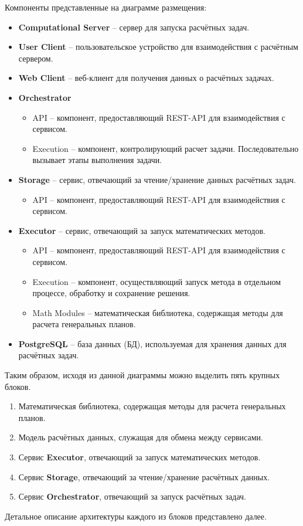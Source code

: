 \noindent Компоненты представленные на диаграмме размещения:
\begin{itemize}
	\item \textbf{Computational Server} -- сервер для запуска расчётных задач.
	\item \textbf{User Client} -- пользовательское устройство для взаимодействия с расчётным сервером.
	\item \textbf{Web Client} -- веб-клиент для получения данных о расчётных задачах.
	\item \textbf{Orchestrator}
	\begin{itemize}
		\item API -- компонент, предоставляющий REST-API для взаимодействия с сервисом.
		\item Execution -- компонент, контролирующий расчет задачи. Последовательно вызывает этапы выполнения задачи.
	\end{itemize}
	\item \textbf{Storage} -- сервис, отвечающий за чтение/хранение данных расчётных задач.
	\begin{itemize}
		\item API -- компонент, предоставляющий REST-API для взаимодействия с сервисом.
	\end{itemize}
	\item \textbf{Executor} -- сервис, отвечающий за запуск математических методов.
	\begin{itemize}
		\item API -- компонент, предоставляющий REST-API для взаимодействия с сервисом.
		\item Execution -- компонент, осуществляющий запуск метода в отдельном процессе, обработку и сохранение решения.
		\item Math Modules -- математическая библиотека, содержащая методы для расчета генеральных планов.
	\end{itemize}
	\item \textbf{PostgreSQL} -- база данных (БД), используемая для хранения данных для расчётных задач.
\end{itemize}

Таким образом, исходя из данной диаграммы можно выделить пять крупных блоков.
\begin{enumerate}
	\item Математическая библиотека, содержащая методы для расчета генеральных планов.
	\item Модель расчётных данных, служащая для обмена между сервисами.
	\item Сервис \textbf{Executor}, отвечающий за запуск математических методов.
	\item Сервис \textbf{Storage}, отвечающий за чтение/хранение расчётных данных.
	\item Сервис \textbf{Orchestrator}, отвечающий за запуск расчётных задач.
\end{enumerate}

Детальное описание архитектуры каждого из блоков представлено далее.